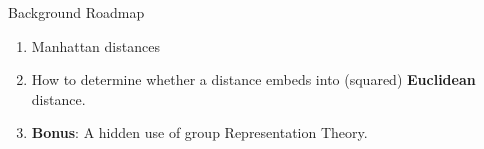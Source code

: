 \begin{frame}{Background Roadmap}
  \begin{enumerate} 
  \item {\color{blue}Manhattan distances}
  \item How to determine whether a distance embeds into (squared)
  \textbf{Euclidean} distance.
  \item \textbf{Bonus}: A hidden use of group Representation Theory.
  \end{enumerate}
\end{frame}

